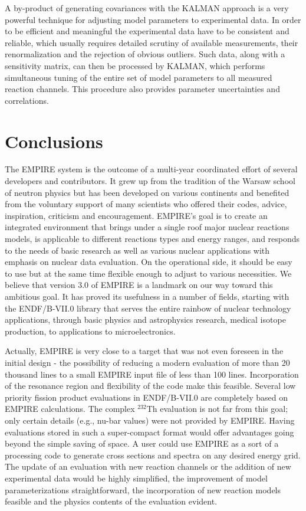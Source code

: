 A by-product of generating covariances with the KALMAN approach is a very
powerful technique for adjusting model parameters to experimental data. In
order to be efficient and meaningful the experimental data have to be
consistent and reliable, which usually requires detailed scrutiny of
available measurements, their renormalization and the rejection of obvious
outliers. Such data, along with a sensitivity matrix, can then be processed
by KALMAN, which performs simultaneous tuning of the entire set of model
parameters to all measured reaction channels. This procedure also provides
parameter uncertainties and correlations.

\section{Conclusions}

The EMPIRE system is the outcome of a multi-year coordinated effort of
several developers and contributors. It grew up from the tradition of the
Warsaw school of neutron physics but has been developed on various
continents and benefited from the voluntary support of many scientists who
offered their codes, advice, inspiration, criticism and encouragement.
EMPIRE's goal is to create an integrated environment that brings under a
single roof major nuclear reactions models, is applicable to different
reactions types and energy ranges, and responds to the needs of basic
research as well as various nuclear applications with emphasis on nuclear
data evaluation. On the operational side, it should be easy to use but at the
same time flexible enough to adjust to various necessities. We believe that
version 3.0 of EMPIRE is a landmark on our way toward this ambitious
goal. It has proved its usefulness in a number of fields, starting with the
ENDF/B-VII.0 library that serves the entire rainbow of nuclear technology
applications, through basic physics and astrophysics research, medical
isotope production, to applications to microelectronics.

Actually, EMPIRE is very close to a target that was not even foreseen in the
initial design - the possibility of reducing a modern evaluation of more than
20 thousand lines to a small EMPIRE input file of less than 100 lines.
Incorporation of the resonance region and flexibility of the code make
this feasible. Several low priority fission product evaluations in
ENDF/B-VII.0 are completely based on EMPIRE calculations. The complex
$^{232}$Th evaluation is not far from this goal; only certain details (e.g.,
nu-bar values) were not provided by EMPIRE. Having evaluations stored in such a
super-compact format would offer advantages going beyond the simple saving of
space. A user could use EMPIRE as a sort of a processing code to generate
cross sections and spectra on any desired energy grid. The update of an
evaluation with new reaction channels or the addition of
new experimental data would be highly simplified, the improvement
of model parameterizations straightforward, the
incorporation of new reaction models feasible and the physics contents of
the evaluation evident.

